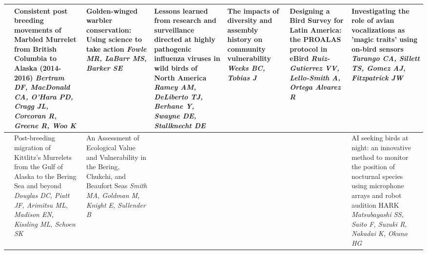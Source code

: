 \begin{tabular}{|x{0.75cm}|a{2.25cm}|a{2.25cm}|a{2.25cm}|a{2.25cm}|a{2.25cm}|x{2.25cm}|}
\hline
{}&Consistent post breeding movements of Marbled Murrelet from British Columbia to Alaska (2014-2016) \newline \newline \textit{Bertram DF, MacDonald CA, O'Hara PD, Cragg JL, Corcoran R, Greene R, Woo K} & Golden-winged warbler conservation: Using science to take action \newline \newline \textit{Fowle MR, LaBarr MS, Barker SE} & Lessons learned from research and surveillance directed at highly pathogenic influenza viruses in wild birds of North America \newline \newline \textit{Ramey AM, DeLiberto TJ, Berhane Y, Swayne DE, Stallknecht DE} & The impacts of diversity and assembly history on community vulnerability \newline \newline \textit{Weeks BC, Tobias J} & Designing a Bird Survey for Latin America: the PROALAS protocol in eBird \newline \newline \textit{Ruiz-Gutierrez VV, Lello-Smith A, Ortega Alvarez R} & Investigating the role of avian vocalizations as 'magic traits' using on-bird sensors \newline \newline \textit{Tarango CA, Sillett TS, Gomez AJ, Fitzpatrick JW}\\
\hline
{}&Post-breeding migration of Kittlitz's Murrelets from the Gulf of Alaska to the Bering Sea and beyond \newline \newline \textit{Douglas DC, Piatt JF, Arimitsu ML, Madison EN, Kissling ML, Schoen SK} & An Assessment of Ecological Value and Vulnerability in the Bering, Chukchi, and Beaufort Seas \newline \newline \textit{Smith MA, Goldman M, Knight E, Sullender B} &  \newline \newline \textit{} &  \newline \newline \textit{} &  \newline \newline \textit{} & AI seeking birds at night: an innovative method to monitor the position of nocturnal species using microphone arrays and robot audition HARK \newline \newline \textit{Matsubayashi SS, Saito F, Suzuki R, Nakadai K, Okuno HG}\\

\end{tabular}
